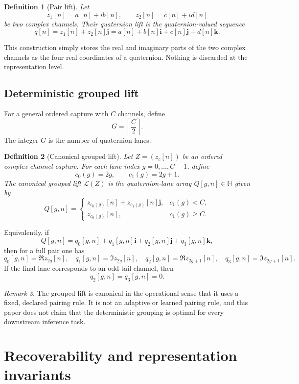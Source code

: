 \documentclass[11pt]{article}
\newtheorem{definition}{Definition}[section]
\theoremstyle{remark}
\newtheorem{remark}[definition]{Remark}
\newcommand{\HH}{\mathbb{H}}
\newcommand{\ii}{\mathbf{i}}
\newcommand{\jj}{\mathbf{j}}
\newcommand{\kk}{\mathbf{k}}
\newcommand{\lift}{\mathcal{L}}
\begin{document}
\begin{definition}[Pair lift]
Let
\[
z_1[n]=a[n]+ib[n],
\qquad
z_2[n]=c[n]+id[n]
\]
be two complex channels. Their quaternion lift is the quaternion-valued sequence
\[
q[n]=z_1[n]+z_2[n]\jj
     = a[n]+b[n]\ii+c[n]\jj+d[n]\kk.
\]
\end{definition}

This construction simply stores the real and imaginary parts of the two complex channels as the four real coordinates of a quaternion. Nothing is discarded at the representation level.

\subsection{Deterministic grouped lift}

For a general ordered capture with \(C\) channels, define
\[
G=\left\lceil \frac{C}{2}\right\rceil.
\]
The integer \(G\) is the number of quaternion lanes.

\begin{definition}[Canonical grouped lift]
Let \(Z=(z_c[n])\) be an ordered complex-channel capture. For each lane index \(g=0,\dots,G-1\), define
\[
c_0(g)=2g,
\qquad
c_1(g)=2g+1.
\]
The canonical grouped lift \(\lift(Z)\) is the quaternion-lane array \(Q[g,n]\in\HH\) given by
\[
Q[g,n]=
\begin{cases}
z_{c_0(g)}[n]+z_{c_1(g)}[n]\jj, & c_1(g)<C,\\[4pt]
z_{c_0(g)}[n], & c_1(g)\ge C.
\end{cases}
\]
\end{definition}

Equivalently, if
\[
Q[g,n]=q_0[g,n]+q_1[g,n]\ii+q_2[g,n]\jj+q_3[g,n]\kk,
\]
then for a full pair one has
\[
q_0[g,n]=\Re z_{2g}[n],\quad
q_1[g,n]=\Im z_{2g}[n],\quad
q_2[g,n]=\Re z_{2g+1}[n],\quad
q_3[g,n]=\Im z_{2g+1}[n].
\]
If the final lane corresponds to an odd tail channel, then
\[
q_2[g,n]=q_3[g,n]=0.
\]

\begin{remark}
The grouped lift is canonical in the operational sense that it uses a fixed, declared pairing rule. It is not an adaptive or learned pairing rule, and this paper does not claim that the deterministic grouping is optimal for every downstream inference task.
\end{remark}

\section{Recoverability and representation invariants}
\end{document}
